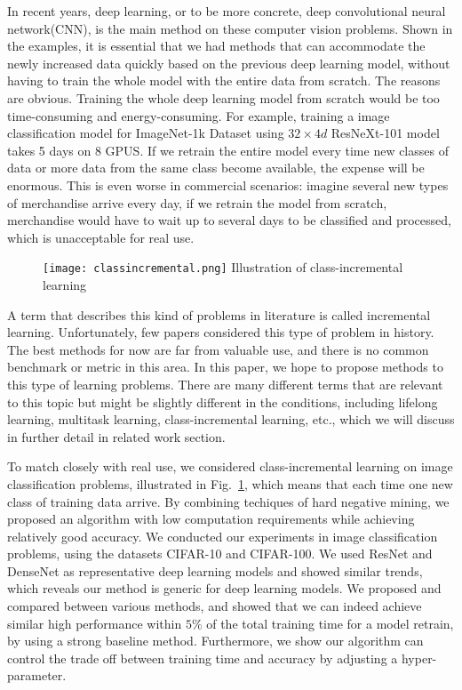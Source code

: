 In recent years, deep learning, or to be more concrete, deep convolutional neural network(CNN), is the main method on these computer vision problems. Shown in the examples, it is essential that we had methods that can accommodate the newly increased data quickly based on the previous deep learning model, without having to train the whole model with the entire data from scratch. The reasons are obvious. Training the whole deep learning model from scratch would be too time-consuming and energy-consuming. For example, training a image classification model for ImageNet-1k Dataset\cite{deng2009imagenet} using $32\times4d$ ResNeXt-101\cite{xie2017aggregated} model takes 5 days on 8 GPUS. If we retrain the entire model every time new classes of data or more data from the same class become available, the expense will be enormous. This is even worse in commercial scenarios: imagine several new types of merchandise arrive every day, if we retrain the model from scratch, merchandise would have to wait up to several days to be classified and processed, which is unacceptable for real use.
\begin{figure}[!htp]
	\centering
	\texttt{[image: classincremental.png]}
	{Illustration of class-incremental learning}
	\label{fig:classincremental}
\end{figure}
A term that describes this kind of problems in literature is called incremental learning. Unfortunately, few papers considered this type of problem in history. The best methods for now are far from valuable use, and there is no common benchmark or metric in this area. In this paper, we hope to propose methods to this type of learning problems. There are many different terms that are relevant to this topic but might be slightly different in the conditions, including lifelong learning, multitask learning, class-incremental learning, etc.\cite{utgoff1989incremental}, which we will discuss in further detail in related work section.

To match closely with real use, we considered class-incremental learning on image classification problems, illustrated in Fig.~\ref{fig:classincremental}, which means that each time one new class of training data arrive. By combining techiques of hard negative mining, we proposed an algorithm with low computation requirements while achieving relatively good accuracy. We conducted our experiments in image classification problems, using the datasets CIFAR-10 and CIFAR-100\cite{krizhevsky2009learning}. We used ResNet\cite{he2016deep} and DenseNet\cite{huang2017densely} as representative deep learning models and showed similar trends, which reveals our method is generic for deep learning models. We proposed and compared between various methods, and showed that we can indeed achieve similar high performance within $5\%$ of the total training time for a model retrain, by using a strong baseline method. Furthermore, we show our algorithm can control the trade off between training time and accuracy by adjusting a hyper-parameter.

